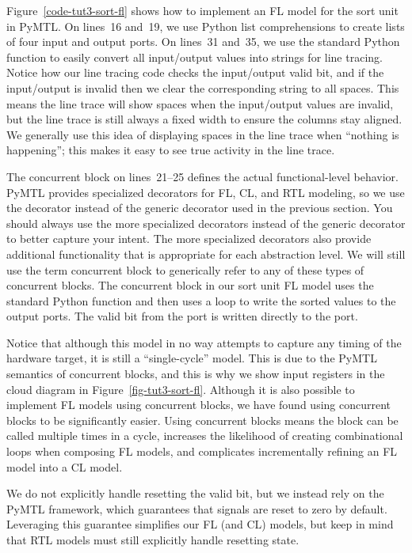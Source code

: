 \documentclass{cbxdoc}
\begin{document}
Figure~\ref{code-tut3-sort-fl} shows how to implement an FL model for the
sort unit in PyMTL. On lines~16 and~19, we use Python list comprehensions
to create lists of four input and output ports. On lines~31 and~35, we
use the standard Python  function to easily convert all
input/output values into strings for line tracing. Notice how our line
tracing code checks the input/output valid bit, and if the input/output
is invalid then we clear the corresponding string to all spaces. This
means the line trace will show spaces when the input/output values are
invalid, but the line trace is still always a fixed width to ensure the
columns stay aligned. We generally use this idea of displaying spaces in
the line trace when ``nothing is happening''; this makes it easy to see
true activity in the line trace.

The  concurrent block on lines~21--25 defines the actual
functional-level behavior. PyMTL provides specialized decorators for FL,
CL, and RTL modeling, so we use the  decorator instead of
the generic  decorator used in the previous section. You
should always use the more specialized decorators instead of the generic
 decorator to better capture your intent. The more specialized
decorators also provide additional functionality that is appropriate for
each abstraction level. We will still use the term  concurrent
block to generically refer to any of these types of concurrent blocks.
The  concurrent block in our sort unit FL model uses the
standard Python  function and then uses a loop to write the
sorted values to the output ports. The valid bit from the 
port is written directly to the  port.

Notice that although this model in no way attempts to capture any timing
of the hardware target, it is still a ``single-cycle'' model. This is due
to the PyMTL semantics of  concurrent blocks, and this is why
we show input registers in the cloud diagram in
Figure~\ref{fig-tut3-sort-fl}. Although it is also possible to implement
FL models using  concurrent blocks, we have found
using  concurrent blocks to be significantly easier. Using
 concurrent blocks means the block can be called
multiple times in a cycle, increases the likelihood of creating
combinational loops when composing FL models, and complicates
incrementally refining an FL model into a CL model.

We do not explicitly handle resetting the valid bit, but we instead rely
on the PyMTL framework, which guarantees that signals are reset to zero
by default. Leveraging this guarantee simplifies our FL (and CL) models,
but keep in mind that RTL models must still explicitly handle resetting
state.
\end{document}
